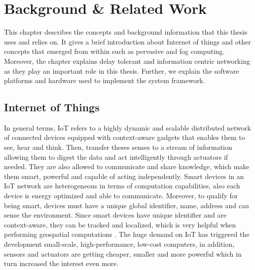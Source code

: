 
\chapter{Background \& Related Work}\label{chapter:background}

This chapter describes the concepts and background information that this thesis uses and relies on. It gives a brief introduction about Internet of things and other concepts that emerged from within such as pervasive and fog computing. Moreover, the chapter explains delay tolerant and information centric networking as they play an important role in this thesis. Further, we explain the software platforms and hardware used to implement the system framework.

\section{Internet of Things}

In general terms, IoT refers to a highly dynamic and scalable distributed network of connected devices equipped with context-aware gadgets that enables them to see, hear and think\cite{DAC:DAC2417}. Then, transfer theses senses to a stream of information allowing them to digest the data and act intelligently through actuators if needed. They are also allowed to communicate and share knowledge, which make them smart, powerful and capable of acting independently. Smart devices in an IoT network are heterogeneous in terms of computation capabilities, also each device is energy optimized and able to communicate. Moreover, to qualify for being smart, devices must have a unique global identifier, name, address and can sense the environment. Since smart devices have unique identifier and are context-aware, they can be tracked and localized, which is very helpful when performing geospatial computations \cite{Miorandi20121497}. The huge demand on IoT has triggered the development small-scale, high-performance, low-cost computers, in addition, sensors and actuators are getting cheaper, smaller and more powerful which in turn increased the interest even more.
 

